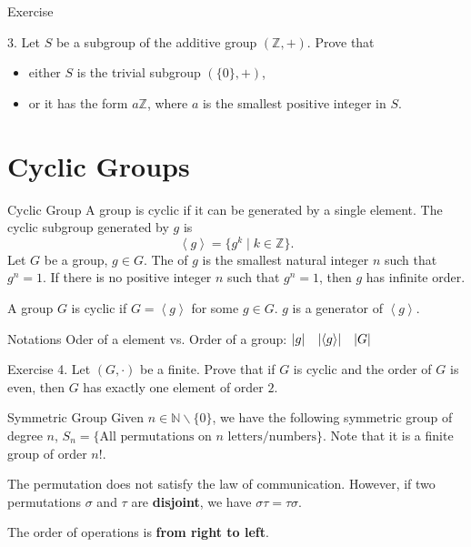 \documentclass{beamer}
\begin{document}
\begin{frame}{Exercise}
    \par 3. Let $S$ be a subgroup of the additive group $(\mathbb{Z}, +)$. Prove that 
    \begin{itemize}
        \item either $S$ is the trivial subgroup $(\{0\}, +)$,
        \item or it has the form $a\mathbb{Z}$, where $a$ is the smallest positive integer in $S$.
    \end{itemize}
\end{frame}

\section{Cyclic Groups}
\begin{frame}{Cyclic Group}
    \hh A group is cyclic if it can be generated by a single element.
    \hh The cyclic subgroup generated by $g$ is
    $$
    \left\langle g \right\rangle = \{g^k \mid k \in \mathbb{Z}\}.
    $$
    \hh Let $G$ be a group, $g \in G$. The  of $g$ is the smallest natural integer $n$ such that $g^n = 1$. If there is no positive integer $n$ such that $g^n = 1 $, then $g$ has infinite order.
    \par \phantom{ji}
    \hh A group $G$ is cyclic if $G = \left\langle g \right\rangle$ for some $g \in G$. $g$ is a generator of $\left\langle g \right\rangle$.
    \begin{block}{Notations}
        \hh Oder of a element vs. Order of a group: $|g| \quad |\langle g\rangle| \quad |G|$
    \end{block}
\end{frame}
\begin{frame}{Exercise}
    4. Let $(G, \cdot)$ be a finite. Prove that if $G$ is cyclic and the order of $G$ is even, then $G$
has exactly one element of order $2$.

\end{frame}
\begin{frame}{Symmetric Group}
    \hh Given $n \in \mathbb{N} \backslash \{0\}$, we have the following symmetric group of degree $n$, $S_{n} =\{\text {All permutations on } n \text { letters/numbers}\}$.
    Note that it is a finite group of order $n!$.
    \par 
    \vs{1em}
    \hh The permutation does not satisfy the law of communication. 
    However, if two permutations $\sigma$ and $\tau$ are \textbf{disjoint}, we have $\sigma \tau = \tau \sigma$.
    \par 
    \vv
    \hh The order of operations is \textbf{from right to left}.
    \end{frame}
\end{document}
